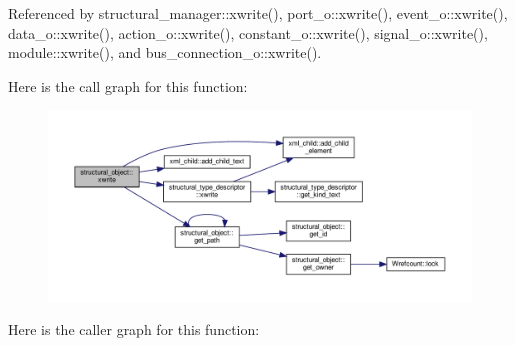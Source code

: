 Referenced by structural\+\_\+manager\+::xwrite(), port\+\_\+o\+::xwrite(), event\+\_\+o\+::xwrite(), data\+\_\+o\+::xwrite(), action\+\_\+o\+::xwrite(), constant\+\_\+o\+::xwrite(), signal\+\_\+o\+::xwrite(), module\+::xwrite(), and bus\+\_\+connection\+\_\+o\+::xwrite().

Here is the call graph for this function\+:
\nopagebreak
\begin{figure}[H]
\begin{center}
\leavevmode
\includegraphics[width=350pt]{d8/da3/classstructural__object_a7b0b509094451578b2dc10a9b716b16e_cgraph}
\end{center}
\end{figure}
Here is the caller graph for this function\+:
\nopagebreak
